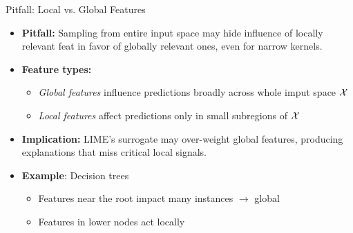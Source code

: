 \documentclass[10pt,compress,t,notes=noshow, xcolor=table]{beamer}
\begin{document}
\begin{frame}{Pitfall: Local vs. Global Features }

\begin{itemize}%
	\item<1-> \textbf{Pitfall:} Sampling from entire input space may hide influence of locally relevant feat in favor of globally relevant ones, even for narrow kernels.
 \item<1-> \textbf{Feature types:}
  \begin{itemize}
    \item \emph{Global features} influence predictions broadly across whole imput space $\mathcal{X}$
    \item \emph{Local features} affect predictions only in small subregions of $\mathcal{X}$
  \end{itemize}
  
  \item<2-> \textbf{Implication:} LIME’s surrogate may over-weight global features, producing explanations that miss critical local signals.
	\item<3-> \textbf{Example}: Decision trees
    \begin{itemize}
        \item Features near the root impact many instances $\rightarrow$ global
        \item Features in lower nodes act locally
    \end{itemize}
\end{itemize}

\end{frame}
\end{document}
